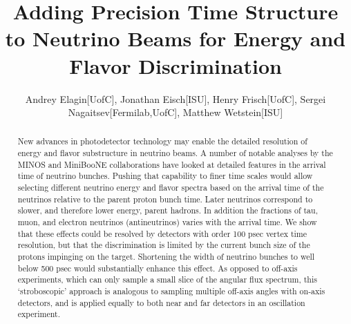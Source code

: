 \documentclass[preprint,12pt]{elsarticle}
\begin{document}
\begin{frontmatter}


\title{Adding Precision Time Structure to Neutrino Beams for Energy and Flavor Discrimination}




\author{Andrey Elagin[UofC], Jonathan Eisch[ISU], Henry Frisch[UofC], Sergei Nagaitsev[Fermilab,UofC], Matthew Wetstein[ISU]}
\address[UofC]{Enrico Fermi Institute, University of Chicago, Chicago IL 60637}
\address[Fermilab]{Fermi National Laboratory, Batavia IL 60510}
\address[ISU]{Matt to Fill in}

\begin{abstract}
New advances in photodetector technology may enable the detailed resolution of energy and flavor substructure in neutrino beams. A number of notable analyses by the MINOS and MiniBooNE collaborations have  looked at detailed features in the arrival time of neutrino bunches. Pushing that capability to finer time scales would allow selecting different neutrino energy and flavor spectra based on the arrival time of the neutrinos relative to the parent proton bunch time. Later neutrinos correspond to slower, and therefore lower energy, parent hadrons. In addition the fractions of tau, muon, and electron neutrinos (antineutrinos) varies with the arrival time. We show that these effects could be resolved by detectors with order 100 psec vertex time resolution, but that the discrimination is limited by the current bunch size of the protons impinging on the target. Shortening the width of neutrino bunches to well below 500 psec would substantially enhance this effect. As opposed to off-axis experiments, which  can only sample a small slice of the angular flux spectrum, this `stroboscopic' approach is analogous to sampling multiple off-axis angles with on-axis detectors, and is applied equally to both near and far detectors in an oscillation experiment. 
\end{abstract}




\end{frontmatter}
\end{document}
